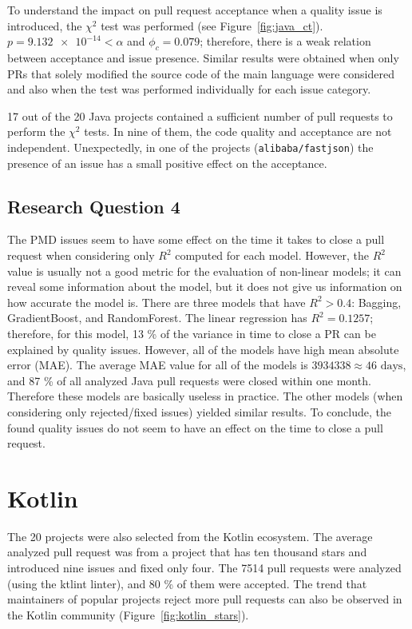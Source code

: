 \documentclass[digital,oneside,oldtable,nolof,nolot,nocover]{fithesis4}
\begin{document}
To understand the impact on pull request acceptance when a quality issue is introduced,
the \(\chi^2\) test was performed (see Figure~\ref{fig:java_ct}).
\(p = \num{9.132e-14} < \alpha\) and \(\phi_c = 0.079\); therefore, there is
a weak relation between acceptance and issue presence. Similar results were
obtained when only PRs that solely modified the source code of the main language were
considered and also when the test was performed individually for each issue category.

17 out of the 20 Java projects contained a sufficient number of pull requests to
perform the \(\chi^2\) tests. In nine of them, the code quality and acceptance are
not independent. Unexpectedly, in one of the projects (\texttt{alibaba/fastjson}) the
presence of an issue has a small positive effect on the acceptance.
\subsection{Research Question 4}
\label{sec:org76f717b}
The PMD issues seem to have some effect on the time it takes to close a pull
request when considering only \(R^2\) computed for each model. However, the
\(R^2\) value is usually not a good metric for the evaluation of non-linear models;
it can reveal some information about the model, but it does not give us
information on how accurate the model is. There are three models that have \(R^2
    > 0.4\): Bagging, GradientBoost, and RandomForest.  The linear regression has
\(R^2 = 0.1257\); therefore, for this model, 13 \% of the variance in time to close a
PR can be explained by quality issues. However, all of the models have high mean
absolute error (MAE). The average MAE value for all of the models is \(3934338
    \approx 46\text{ days}\), and 87 \% of all analyzed Java pull requests were
closed within one month. Therefore these models are basically useless in
practice. The other models (when considering only rejected/fixed issues) yielded
similar results. To conclude, the found quality issues do not seem to have an
effect on the time to close a pull request.
\FloatBarrier
\section{Kotlin}
\label{sec:orgcb25150}
The 20 projects were also selected from the Kotlin ecosystem.
The average analyzed pull request was from a project that has ten thousand
stars and introduced nine issues and fixed only four. The 7514 pull requests
were analyzed (using the ktlint linter), and 80 \% of them were accepted.
The trend that maintainers of popular projects reject more pull requests can
also be observed in the Kotlin community (Figure~\ref{fig:kotlin_stars}).
\end{document}
